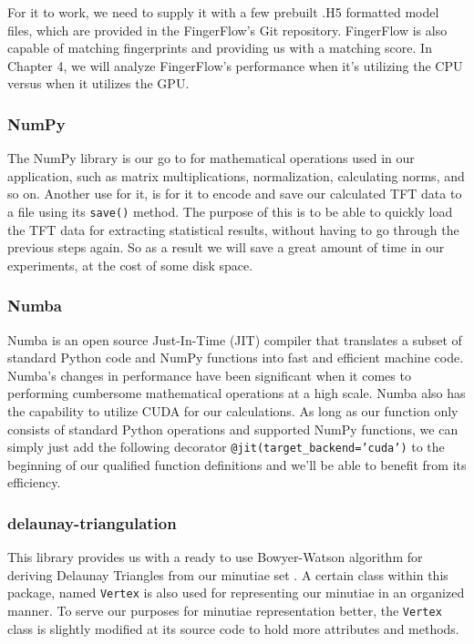 \documentclass[fyp]{socreport}
\begin{document}
For it to work, we need to supply it with a few prebuilt .H5 formatted model files, which are provided in the FingerFlow's Git repository. FingerFlow is also capable of matching fingerprints and providing us with a matching score. In Chapter 4, we will analyze FingerFlow's performance when it's utilizing the CPU versus when it utilizes the GPU.

\subsubsection{NumPy}
The NumPy library is our go to for mathematical operations used in our application, such as matrix multiplications, normalization, calculating norms, and so on. Another use for it, is for it to encode and save our calculated TFT data to a file using its \texttt{save()} method. The purpose of this is to be able to quickly load the TFT data for extracting statistical results, without having to go through the previous steps again. So as a result we will save a great amount of time in our experiments, at the cost of some disk space.

\subsubsection{Numba}
Numba is an open source Just-In-Time (JIT) compiler that translates a subset of standard Python code and NumPy functions into fast and efficient machine code. Numba's changes in performance have been significant when it comes to performing cumbersome mathematical operations at a high scale. Numba also has the capability to utilize CUDA for our calculations. As long as our function only consists of standard Python operations and supported NumPy functions, we can simply just add the following decorator \texttt{@jit(target\_backend='cuda')} to the beginning of our qualified function definitions and we'll be able to benefit from its efficiency.

\subsubsection{delaunay-triangulation}
This library provides us with a ready to use Bowyer-Watson algorithm for deriving Delaunay Triangles from our minutiae set \cite{delgit}. A certain class within this package, named \texttt{Vertex} is also used for representing our minutiae in an organized manner. To serve our purposes for minutiae representation better, the \texttt{Vertex} class is slightly modified at its source code to hold more attributes and methods.
\end{document}
